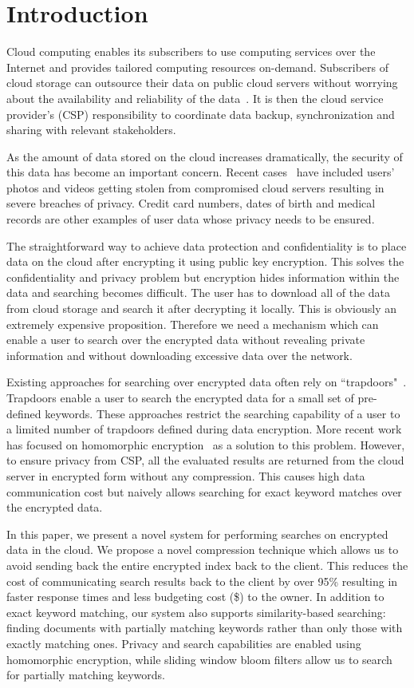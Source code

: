 \section{Introduction}

Cloud computing enables its subscribers to use computing services over the 
Internet and provides tailored computing resources on-demand. 
Subscribers of cloud storage can outsource their data on public cloud servers
without worrying about the availability and
reliability of the data~\cite{wang2012toward}. It is then the cloud service provider's (CSP) 
responsibility to coordinate data backup, synchronization and sharing
with relevant stakeholders. 

As the amount of data stored on the cloud increases dramatically, the security 
of this data has become an important concern. Recent cases~\cite{top_threats}
have included users' photos and videos getting stolen from compromised cloud servers resulting in
severe breaches of privacy. Credit card numbers, dates of birth and medical
records are other examples of user data whose privacy needs to be ensured.

The straightforward way to achieve data protection and confidentiality is to
place data on the cloud after encrypting it using public key encryption.
This solves the confidentiality and privacy problem
but encryption hides information within the data and searching becomes difficult. The user
has to download all of the data from cloud storage and search it after decrypting it locally. This is
obviously an extremely expensive proposition. Therefore we need a mechanism 
which can enable a user to search over the encrypted data without revealing 
private information and without downloading excessive data over the network.

Existing approaches for searching over encrypted data often rely on
``trapdoors"~\cite{song,goh2003secure,boneh}. 
Trapdoors enable a user to search the encrypted data for a small 
set of pre-defined keywords. These approaches restrict the searching
capability of a user to a limited number of trapdoors defined during data 
encryption. More recent work has focused on homomorphic encryption~\cite{craig,zeehan} as a solution
to this problem. However, to ensure privacy from CSP, all the evaluated results
are returned from the cloud server in encrypted form without any compression. This causes high data
communication cost but naively allows searching for exact keyword matches over the encrypted data.

In this paper, we present a novel system for performing searches on encrypted 
data in the cloud. We propose a novel compression technique which allows us to
avoid sending back the entire encrypted index back to the client. This reduces the cost of
communicating search results back to the client by over 95\% resulting in 
faster response times and less budgeting cost (\$) to the owner. 
In addition to exact keyword matching, our system also
supports similarity-based searching: finding documents with partially matching 
keywords rather than only those with exactly matching ones. Privacy and search 
capabilities are enabled using homomorphic encryption, while sliding window 
bloom filters allow us to search for partially matching keywords. 

